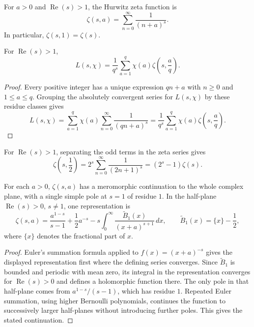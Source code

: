 \begin{definition}
For $a>0$ and $\operatorname{Re}(s)>1$, the Hurwitz zeta function is
\[
 \zeta(s,a)=\sum_{n=0}^{\infty}\frac{1}{(n+a)^s}.
\]
In particular, $\zeta(s,1)=\zeta(s)$.
\end{definition}

\begin{proposition}
For $\operatorname{Re}(s)>1$,
\[
 L(s,\chi)=\frac{1}{q^s}\sum_{a=1}^{q}\chi(a)\zeta\!\left(s,\frac{a}{q}\right).
\]
\end{proposition}

\begin{proof}
Every positive integer has a unique expression $qn+a$ with $n\geq0$ and $1\leq a\leq q$. Grouping the absolutely convergent series for $L(s,\chi)$ by these residue classes gives
\[
 L(s,\chi)=\sum_{a=1}^{q}\chi(a)\sum_{n=0}^{\infty}\frac{1}{(qn+a)^s}
 =\frac{1}{q^s}\sum_{a=1}^{q}\chi(a)\zeta\!\left(s,\frac{a}{q}\right).
\]
\end{proof}

\begin{example}
For $\operatorname{Re}(s)>1$, separating the odd terms in the zeta series gives
\[
 \zeta\!\left(s,\frac12\right)
 =2^s\sum_{n=0}^{\infty}\frac{1}{(2n+1)^s}
 =(2^s-1)\zeta(s).
\]
\end{example}

\begin{theorem}
For each $a>0$, $\zeta(s,a)$ has a meromorphic continuation to the whole complex plane, with a single simple pole at $s=1$ of residue $1$. In the half-plane $\operatorname{Re}(s)>0$, $s\neq1$, one representation is
\[
 \zeta(s,a)=\frac{a^{1-s}}{s-1}+\frac12a^{-s}
 -s\int_0^{\infty}\frac{\widetilde B_1(x)}{(x+a)^{s+1}}\,dx,
 \qquad \widetilde B_1(x)=\{x\}-\frac12,
\]
where $\{x\}$ denotes the fractional part of $x$.
\end{theorem}

\begin{proof}
Euler's summation formula applied to $f(x)=(x+a)^{-s}$ gives the displayed representation first where the defining series converges. Since $\widetilde B_1$ is bounded and periodic with mean zero, its integral in the representation converges for $\operatorname{Re}(s)>0$ and defines a holomorphic function there. The only pole in that half-plane comes from $a^{1-s}/(s-1)$, which has residue $1$. Repeated Euler summation, using higher Bernoulli polynomials, continues the function to successively larger half-planes without introducing further poles. This gives the stated continuation.
\end{proof}

